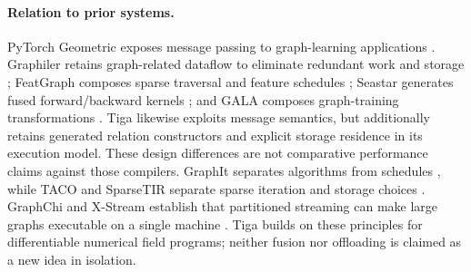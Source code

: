 \paragraph{Relation to prior systems.}
PyTorch Geometric exposes message passing to graph-learning applications
\citep{pyg,pyg2}. Graphiler retains graph-related dataflow to eliminate redundant
work and storage \citep{graphiler}; FeatGraph composes sparse traversal and
feature schedules \citep{featgraph}; Seastar generates fused forward/backward
kernels \citep{seastar}; and GALA composes graph-training transformations
\citep{gala}. Tiga likewise exploits message semantics, but additionally retains
generated relation constructors and explicit storage residence in its execution
model. These design differences are not comparative performance claims against
those compilers. GraphIt separates algorithms from schedules \citep{graphit},
while TACO and SparseTIR separate sparse iteration and storage choices
\citep{taco,sparsetir}. GraphChi and X-Stream establish that partitioned streaming
can make large graphs executable on a single machine \citep{graphchi,xstream}.
Tiga builds on these principles for differentiable numerical field programs;
neither fusion nor offloading is claimed as a new idea in isolation.
